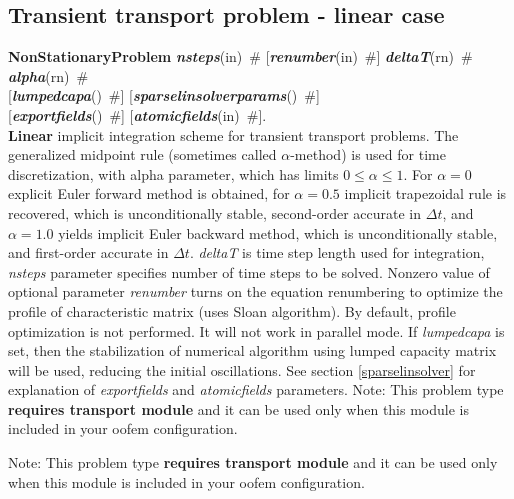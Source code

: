 \documentclass[draft]{article}
\newcommand{\param}[1]{{\em #1}}
\newcommand{\keywordnotype}[1]{\mbox{{\it{\bf{#1}}}}}
\newcommand{\keyword}[2]{\mbox{{\keywordnotype{#1}\tiny (#2)}}}
\newcommand{\entKeywordInst}[1]{\mbox{{\bf{{#1}}}}}
\newcommand{\field}[2]{\mbox{\keyword{#1}{#2}~\#}}
\newcommand{\optField}[2]{\mbox{[\field{#1}{#2}]}}
\begin{document}
\subsection{Transient transport problem - linear case}
\label{LinearTransientTransport}
\entKeywordInst{NonStationaryProblem} \field{nsteps}{in} \optField{renumber}{in}
\field{deltaT}{rn} \field{alpha}{rn}\\ \optField{lumpedcapa}{}
\optField{sparselinsolverparams}{}\\
\optField{exportfields}{} \optField{atomicfields}{in}.\\
{\bf Linear} implicit
integration scheme for transient transport problems. The generalized
midpoint rule (sometimes called $\alpha$-method) is used for time discretization, with alpha parameter,
which has limits $0\le\alpha\le1$. For $\alpha=0$ explicit Euler
forward method is obtained, for $\alpha=0.5$ implicit trapezoidal rule
is recovered, which is unconditionally stable, second-order accurate
in $\Delta t$, and $\alpha=1.0$ yields implicit Euler backward method,
which is unconditionally stable, and first-order accurate
in $\Delta t$. \param{deltaT} is time step length used for
integration, \param{nsteps} parameter specifies
number of time steps to be solved.
Nonzero value of optional parameter \param{renumber} turns on the
equation renumbering to optimize the profile of characteristic matrix
(uses Sloan algorithm). By default, profile optimization is not
performed. It will not work in parallel mode.
If \param{lumpedcapa} is set, then the stabilization of numerical
algorithm using lumped capacity matrix will be used, reducing the
initial oscillations.
See section \ref{sparselinsolver} for explanation of
\param{exportfields} and \param{atomicfields} parameters.
Note: This problem type {\bf requires transport module} and it
can be used only when this module is included in your oofem
configuration.

Note: This problem type {\bf requires transport module} and it
can be used only when this module is included in your oofem
configuration.
\end{document}
